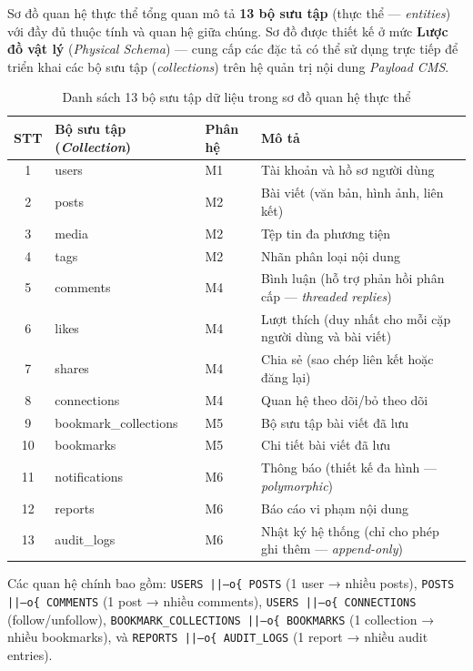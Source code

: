 \documentclass[13pt,a4paper,oneside]{extreport}
\numberwithin{equation}{chapter}
\numberwithin{figure}{chapter}
\numberwithin{table}{chapter}
\begin{document}
Sơ đồ quan hệ thực thể tổng quan mô tả \textbf{13 bộ sưu tập} (thực thể — \textit{entities}) với đầy đủ thuộc tính và quan hệ giữa chúng. Sơ đồ được thiết kế ở mức \textbf{Lược đồ vật lý} (\textit{Physical Schema}) — cung cấp các đặc tả có thể sử dụng trực tiếp để triển khai các bộ sưu tập (\textit{collections}) trên hệ quản trị nội dung \textit{Payload CMS}.

\begin{table}[H]
\centering
\caption{Danh sách 13 bộ sưu tập dữ liệu trong sơ đồ quan hệ thực thể}
\label{tab:er-collections}
\begin{tabular}{|c|p{3.5cm}|p{1.5cm}|p{6cm}|}
\hline
\textbf{STT} & \textbf{Bộ sưu tập (\textit{Collection})} & \textbf{Phân hệ} & \textbf{Mô tả} \\
\hline
1 & users & M1 & Tài khoản và hồ sơ người dùng \\
\hline
2 & posts & M2 & Bài viết (văn bản, hình ảnh, liên kết) \\
\hline
3 & media & M2 & Tệp tin đa phương tiện \\
\hline
4 & tags & M2 & Nhãn phân loại nội dung \\
\hline
5 & comments & M4 & Bình luận (hỗ trợ phản hồi phân cấp — \textit{threaded replies}) \\
\hline
6 & likes & M4 & Lượt thích (duy nhất cho mỗi cặp người dùng và bài viết) \\
\hline
7 & shares & M4 & Chia sẻ (sao chép liên kết hoặc đăng lại) \\
\hline
8 & connections & M4 & Quan hệ theo dõi/bỏ theo dõi \\
\hline
9 & bookmark\_collections & M5 & Bộ sưu tập bài viết đã lưu \\
\hline
10 & bookmarks & M5 & Chi tiết bài viết đã lưu \\
\hline
11 & notifications & M6 & Thông báo (thiết kế đa hình — \textit{polymorphic}) \\
\hline
12 & reports & M6 & Báo cáo vi phạm nội dung \\
\hline
13 & audit\_logs & M6 & Nhật ký hệ thống (chỉ cho phép ghi thêm — \textit{append-only}) \\
\hline
\end{tabular}
\end{table}

Các quan hệ chính bao gồm: \texttt{USERS ||--o\{ POSTS} (1 user → nhiều posts), \texttt{POSTS ||--o\{ COMMENTS} (1 post → nhiều comments), \texttt{USERS ||--o\{ CONNECTIONS} (follow/unfollow), \texttt{BOOKMARK\_COLLECTIONS ||--o\{ BOOKMARKS} (1 collection → nhiều bookmarks), và \texttt{REPORTS ||--o\{ AUDIT\_LOGS} (1 report → nhiều audit entries).
\end{document}
